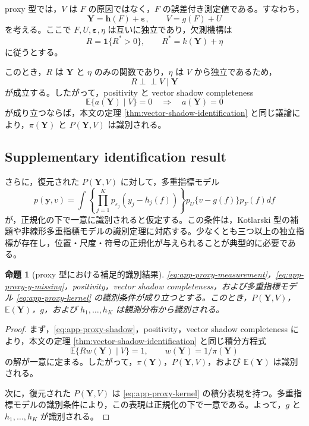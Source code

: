 \documentclass[10pt,a4paper]{article}
\newtheorem{proposition}{命題}
\newcommand{\indep}{\mathrel{\perp\!\!\!\perp}}
\newcommand{\E}{\mathbb{E}}
\newcommand{\1}{\mathbf{1}}
\newcommand{\Y}{\bm{Y}}
\newcommand{\eps}{\bm{\varepsilon}}
\begin{document}
proxy 型では，$V$ は $F$ の原因ではなく，$F$ の誤差付き測定値である。すなわち，
\begin{equation}
  \Y=\bm h(F)+\eps,
  \qquad
  V=g(F)+U
  \label{eq:app-proxy-measurement}
\end{equation}
を考える。ここで $F,U,\eps,\eta$ は互いに独立であり，欠測機構は
\begin{equation}
  R=\1\{R^*>0\},
  \qquad
  R^*=k(\Y)+\eta
  \label{eq:app-proxy-y-missing}
\end{equation}
に従うとする。

このとき，$R$ は $\Y$ と $\eta$ のみの関数であり，$\eta$ は $V$ から独立であるため，
\begin{equation}
  R\indep V\mid \Y
  \label{eq:app-proxy-shadow}
\end{equation}
が成立する。したがって，positivity と vector shadow completeness
\begin{equation}
  \E\{a(\Y)\mid V\}=0
  \quad\Longrightarrow\quad
  a(\Y)=0
  \label{eq:app-proxy-completeness}
\end{equation}
が成り立つならば，本文の定理 \ref{thm:vector-shadow-identification} と同じ議論により，$\pi(\Y)$ と $P(\Y,V)$ は識別される。

\subsection{Supplementary identification result}

さらに，復元された $P(\Y,V)$ に対して，多重指標モデル
\begin{equation}
  p(\bm y,v)
  =
  \int
  \left\{\prod_{j=1}^K p_{\varepsilon_j}(y_j-h_j(f))\right\}
  p_U\{v-g(f)\}
  p_F(f)df
  \label{eq:app-proxy-kernel}
\end{equation}
が，正規化の下で一意に識別されると仮定する。この条件は，Kotlarski 型の補題や非線形多重指標モデルの識別定理に対応する。少なくとも三つ以上の独立指標が存在し，位置・尺度・符号の正規化が与えられることが典型的に必要である。

\begin{proposition}[proxy 型における補足的識別結果]
\label{prop:app-proxy-identification}
\eqref{eq:app-proxy-measurement}，\eqref{eq:app-proxy-y-missing}，positivity，vector shadow completeness，および多重指標モデル \eqref{eq:app-proxy-kernel} の識別条件が成り立つとする。このとき，$P(\Y,V)$，$\E(\Y)$，$g$，および $h_1,\ldots,h_K$ は観測分布から識別される。
\end{proposition}

\begin{proof}
まず，\eqref{eq:app-proxy-shadow}，positivity，vector shadow completeness により，本文の定理 \ref{thm:vector-shadow-identification} と同じ積分方程式
\begin{equation}
  \E\{Rw(\Y)\mid V\}=1,
  \qquad
  w(\Y)=1/\pi(\Y)
\end{equation}
の解が一意に定まる。したがって，$\pi(\Y)$，$P(\Y,V)$，および $\E(\Y)$ は識別される。

次に，復元された $P(\Y,V)$ は \eqref{eq:app-proxy-kernel} の積分表現を持つ。多重指標モデルの識別条件により，この表現は正規化の下で一意である。よって，$g$ と $h_1,\ldots,h_K$ が識別される。
\end{proof}
\end{document}
